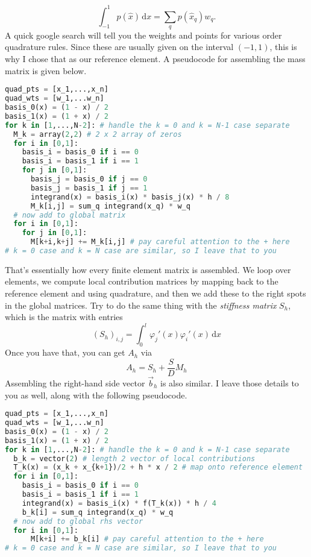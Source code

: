 \documentclass{article}
\theoremstyle{definition}
\theoremstyle{plain}
\begin{document}
\begin{equation}
  \int_{-1}^1p(\widehat x)\,\mathrm dx = \sum_q p(\widehat x_q)w_q.
\end{equation}
A quick google search will tell you the weights and points for various order quadrature rules.
Since these are usually given on the interval $(-1,1)$, this is why I chose that as our reference element.
A pseudocode for assembling the mass matrix is given below.
\newpage
\begin{lstlisting}[language=Python]
quad_pts = [x_1,...,x_n]
quad_wts = [w_1,...w_n]
basis_0(x) = (1 - x) / 2
basis_1(x) = (1 + x) / 2
for k in [1,...,N-2]: # handle the k = 0 and k = N-1 case separate
  M_k = array(2,2) # 2 x 2 array of zeros
  for i in [0,1]:
    basis_i = basis_0 if i == 0
    basis_i = basis_1 if i == 1
    for j in [0,1]:
      basis_j = basis_0 if j == 0
      basis_j = basis_1 if j == 1
      integrand(x) = basis_i(x) * basis_j(x) * h / 8
      M_k[i,j] = sum_q integrand(x_q) * w_q
  # now add to global matrix
  for i in [0,1]:
    for j in [0,1]:
      M[k+i,k+j] += M_k[i,j] # pay careful attention to the + here
# k = 0 case and k = N case are similar, so I leave that to you
\end{lstlisting}
That's essentially how every finite element matrix is assembled.
We loop over elements, we compute local contribution matrices by mapping back to the reference element and using quadrature, and then we add these to the right spots in the global matrices.
Try to do the same thing with the \emph{stiffness matrix} $S_h$, which is the matrix with entries 
\begin{equation}
  (S_h)_{i,j} = \int_0^l\varphi_j'(x)\varphi_i'(x)\,\mathrm dx
\end{equation}
Once you have that, you can get $A_h$ via
\begin{equation}
  A_h = S_h + \frac{S}{D}M_h
\end{equation}
Assembling the right-hand side vector $\vec b_h$ is also similar.
I leave those details to you as well, along with the following pseudocode.
\newpage
\begin{lstlisting}[language=Python]
quad_pts = [x_1,...,x_n]
quad_wts = [w_1,...w_n]
basis_0(x) = (1 - x) / 2
basis_1(x) = (1 + x) / 2
for k in [1,...,N-2]: # handle the k = 0 and k = N-1 case separate
  b_k = vector(2) # length 2 vector of local contributions
  T_k(x) = (x_k + x_{k+1})/2 + h * x / 2 # map onto reference element
  for i in [0,1]:
    basis_i = basis_0 if i == 0
    basis_i = basis_1 if i == 1
    integrand(x) = basis_i(x) * f(T_k(x)) * h / 4
    b_k[i] = sum_q integrand(x_q) * w_q
  # now add to global rhs vector
  for i in [0,1]:
      M[k+i] += b_k[i] # pay careful attention to the + here
# k = 0 case and k = N case are similar, so I leave that to you
\end{lstlisting}
\end{document}
